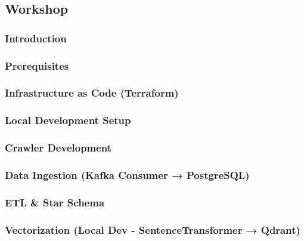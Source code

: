 \newpage

\subsection{Workshop}

\subsubsection{Introduction}


\subsubsection{Prerequisites}


\subsubsection{Infrastructure as Code (Terraform)}


\subsubsection{Local Development Setup}


\subsubsection{Crawler Development}


\subsubsection{Data Ingestion (Kafka Consumer → PostgreSQL)}


\subsubsection{ETL \& Star Schema}


\subsubsection{Vectorization (Local Dev - SentenceTransformer → Qdrant)}


